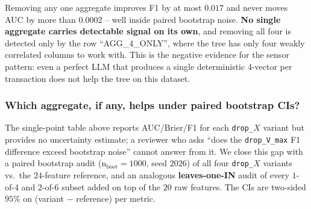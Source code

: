 Removing any one aggregate improves F1 by at most $0.017$ and never
moves AUC by more than $0.0002$ -- well inside paired bootstrap noise.
\textbf{No single aggregate carries detectable signal on its own}, and
removing all four is detected only by the row ``AGG\_4\_ONLY'', where
the tree has only four weakly correlated columns to work with. This is
the negative evidence for the sensor pattern: even a perfect LLM that
produces a single deterministic 4-vector per transaction does not help
the tree on this dataset.

\subsubsection{Which aggregate, if any, helps under paired bootstrap CIs?}

The single-point table above reports AUC/Brier/F1 for each
\texttt{drop\_$X$} variant but provides no uncertainty estimate; a
reviewer who asks ``does the \texttt{drop\_V\_max} F1 difference
exceed bootstrap noise'' cannot answer from it. We close this gap with
a paired bootstrap audit (n$_{\text{boot}}{=}1000$, seed $2026$) of
all four \texttt{drop\_$X$} variants vs.\ the $24$-feature reference,
and an analogous \textbf{leaves-one-IN} audit of every $1$-of-$4$ and
$2$-of-$6$ subset added on top of the $20$ raw features. The CIs are
two-sided $95$\% on (variant $-$ reference) per metric.

